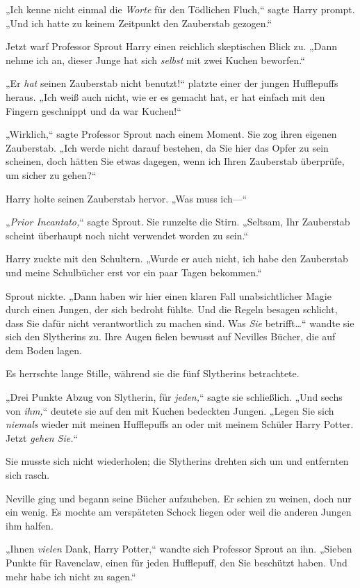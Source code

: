 {„Ich kenne nicht einmal die \emph{Worte} für den Tödlichen Fluch,“ sagte Harry prompt. „Und ich hatte zu keinem Zeitpunkt den Zauberstab gezogen.“

Jetzt warf Professor Sprout Harry einen reichlich skeptischen Blick zu. „Dann nehme ich an, dieser Junge hat sich \emph{selbst} mit zwei Kuchen beworfen.“

„Er \emph{hat} seinen Zauberstab nicht benutzt!“ platzte einer der jungen Hufflepuffs heraus. „Ich weiß auch nicht, wie er es gemacht hat, er hat einfach mit den Fingern geschnippt und da war Kuchen!“

„Wirklich,“ sagte Professor Sprout nach einem Moment. Sie zog ihren eigenen Zauberstab. „Ich werde nicht darauf bestehen, da Sie hier das Opfer zu sein scheinen, doch hätten Sie etwas dagegen, wenn ich Ihren Zauberstab überprüfe, um sicher zu gehen?“

Harry holte seinen Zauberstab hervor. „Was muss ich—“

„\emph{Prior Incantato,}“ sagte Sprout. Sie runzelte die Stirn. „Seltsam, Ihr Zauberstab scheint überhaupt noch nicht verwendet worden zu sein.“

Harry zuckte mit den Schultern. „Wurde er auch nicht, ich habe den Zauberstab und meine Schulbücher erst vor ein paar Tagen bekommen.“

Sprout nickte. „Dann haben wir hier einen klaren Fall unabsichtlicher Magie durch einen Jungen, der sich bedroht fühlte. Und die Regeln besagen schlicht, dass Sie dafür nicht verantwortlich zu machen sind. Was \emph{Sie} betrifft…“ wandte sie sich den Slytherins zu. Ihre Augen fielen bewusst auf Nevilles Bücher, die auf dem Boden lagen.

Es herrschte lange Stille, während sie die fünf Slytherins betrachtete.

„Drei Punkte Abzug von Slytherin, für \emph{jeden,}“ sagte sie schließlich. „Und sechs von \emph{ihm,}“ deutete sie auf den mit Kuchen bedeckten Jungen. „Legen Sie sich \emph{niemals} wieder mit meinen Hufflepuffs an oder mit meinem Schüler Harry Potter. Jetzt \emph{gehen Sie.}“

Sie musste sich nicht wiederholen; die Slytherins drehten sich um und entfernten sich rasch.

Neville ging und begann seine Bücher aufzuheben. Er schien zu weinen, doch nur ein wenig. Es mochte am verspäteten Schock liegen oder weil die anderen Jungen ihm halfen.

„Ihnen \emph{vielen} Dank, Harry Potter,“ wandte sich Professor Sprout an ihn. „Sieben Punkte für Ravenclaw, einen für jeden Hufflepuff, den Sie beschützt haben. Und mehr habe ich nicht zu sagen.“

}

